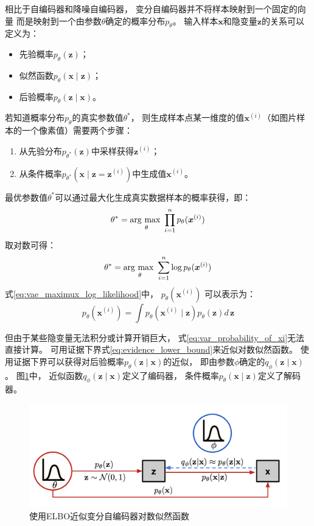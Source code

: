 相比于自编码器和降噪自编码器，
变分自编码器并不将样本映射到一个固定的向量
而是映射到一个由参数{$\theta$}确定的概率分布{$p_{\theta}$}。
输入样本{$\bm{x}$}和隐变量{$\bm{z}$}的关系可以定义为：
\begin{itemize}
    \item 先验概率{$p_{\theta}(\bm{z})$}；
    \item 似然函数{$p_{\theta}(\bm{x}\mid \bm{z})$}；
    \item 后验概率{$p_{\theta}(\bm{z}\mid \bm{x})$}。
\end{itemize}

若知道概率分布{$p_{\theta}$}的真实参数值{$\theta ^{*}$}，
则生成样本点某一维度的值{$\bm{x}^{(i)}$}（如图片样本的一个像素值）需要两个步骤：
\begin{enumerate}
    \item 从先验分布{$p_{\theta^{*}}(\bm{z})$}中采样获得{$\bm{z}^{(i)}$}；
    \item 从条件概率{$p_{\theta^{*}}(\bm{x}\mid \bm{z}=\bm{z}^{(i)})$}中生成值{$\bm{x}^{(i)}$}。
\end{enumerate}

最优参数值{$\theta^{*}$}可以通过最大化生成真实数据样本的概率获得，即：
\begin{equation}
    \label{eq:vae_maximum_likelihood}
    \theta ^{*}=\argmax_{\theta}\prod_{i=1}^{n}p_{\theta}(\bm{x}^{(i)})
\end{equation}
取对数可得：
\begin{equation}
    \label{eq:vae_maximux_log_likelihood}
    \theta ^{*}=\argmax_{\theta}\sum_{i=1}^{n}\log p_{\theta}(\bm{x}^{(i)})
\end{equation}
式{\ref{eq:vae_maximux_log_likelihood}}中，
{$p_{\theta}(\bm{x}^{(i)})$}
可以表示为：
\begin{equation}
    \label{eq:var_probability_of_xi}
    p_{\theta}(\bm{x}^{(i)})=\int p_{\theta}(\bm{x}^{(i)} \mid \bm{z}) p_{\theta}(\bm{z}) d\,{\bm{z}}
\end{equation}

但由于某些隐变量无法积分或计算开销巨大，
式{\ref{eq:var_probability_of_xi}}无法直接计算。
可用证据下界式{\ref{eq:evidence_lower_bound}}来近似对数似然函数。
使用证据下界可以获得对后验概率{$p_{\theta}(\bm{z}\mid\bm{x})$}的近似，
即由参数{$\phi$}确定的{$q_{\phi}(\bm{z}\mid\bm{x})$}。
图{\ref{fig:vae_elbo}}中，
近似函数{$q_{\phi}(\bm{z}\mid\bm{x})$}定义了编码器，
条件概率{$p_{\theta}(\bm{x}\mid\bm{z})$}定义了解码器。
\begin{figure}[ht]
    \centering
    \includegraphics[width=\textwidth]{figures/vae_elbo}
    \caption{使用ELBO近似变分自编码器对数似然函数}\label{fig:vae_elbo}
\end{figure}

